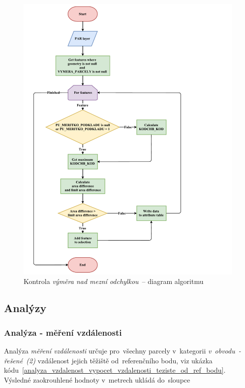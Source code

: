 	\begin{figure}[H]
		\centering
		\includegraphics[width=1.2\textwidth]{./pictures/vymera.pdf}
		\caption[Kontrola \textit{výměra nad mezní odchylkou}~– diagram algoritmu]{Kontrola \textit{výměra nad mezní odchylkou}~– diagram algoritmu}
		\label{fig:diagram_vymera}
 	\end{figure}

\subsection{Analýzy}
\label{analyzy}

\subsubsection{Analýza - měření vzdálenosti}
\label{analyza_vzdalenosti}

Analýza \textit{měření vzdálenosti} určuje pro~všechny parcely v~kategorii \textit{v~obvodu~- řešené~(2)} vzdálenost jejich těžiště od~referenčního bodu, viz ukázka kódu~\ref{analyza_vzdalenost_vypocet_vzdalenosti_teziste_od_ref_bodu}. Výsledné zaokrouhlené hodnoty v~metrech ukládá do~sloupce \texttt{}

